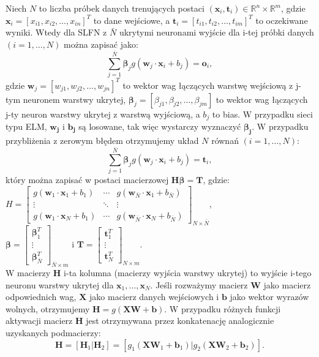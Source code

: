 \documentclass{article}
\begin{document}
Niech $N$ to liczba próbek danych trenujących postaci $(\bm{x}_i, \bm{t}_i) \in \mathbb{R}^n \times \mathbb{R}^m$, gdzie $\bm{x}_i = [x_{i1}, x_{i2}, \dots,  x_{in}]^T$ to dane wejściowe, a $\bm{t}_i = [t_{i1}, t_{i2}, \dots,  t_{im}]^T$ to oczekiwane wyniki. Wtedy dla SLFN z $\bar{N}$ ukrytymi neuronami wyjście dla i-tej próbki danych $(i=1,\dots,N)$ można zapisać jako:
\begin{equation}
\sum_{j=1}^{\bar{N}} \bm{\beta}_j g (\bm{w}_j \cdot \bm{x}_i + b_j)  = \bm{o}_i,
\end{equation}
gdzie $\bm{w}_j = [w_{j1}, w_{j2},\dots,w_{jn}]^T$ to wektor wag łączących warstwę wejściową z j-tym neuronem warstwy ukrytej, $\bm{\beta}_j = [\beta_{j1}, \beta_{j2}, \dots, \beta_{jm}]$ to wektor wag łączących j-ty neuron warstwy ukrytej z warstwą wyjściową, a $b_j$ to bias. W przypadku sieci typu ELM, $\bm{w_j}$ i $\bm{b_j}$ są losowane, tak więc wystarczy wyznaczyć $\bm{\beta_j}$.  W przypadku przybliżenia z zerowym błędem otrzymujemy układ $N$ równań $(i=1,\dots,N)$:
\begin{equation}
\sum_{j=1}^{\bar{N}} \bm{\beta}_j g (\bm{w}_j \cdot \bm{x}_i + b_j)  = \bm{t}_i,
\end{equation}
który można zapisać w postaci macierzowej $\bm{H}\bm{\beta}=\bm{T}$, gdzie: \\
$
H = \begin{bmatrix}
 g(\bm{w}_1 \cdot \bm{x}_1 + b_1) & \cdots & g(\bm{w}_{\bar{N}} \cdot \bm{x}_1 + b_{\bar{N}}) \\
 \vdots & \ddots & \vdots \\
 g(\bm{w}_1 \cdot \bm{x}_N + b_1) & \cdots & g(\bm{w}_{\bar{N}} \cdot \bm{x}_N + b_{\bar{N}})
\end{bmatrix}_{N \times \bar{N}}$, \\
$\bm{\beta} = \begin{bmatrix} \bm{\beta}_1^T \\ \vdots \\ \bm{\beta}_{\bar{N}}^T \end{bmatrix}_{\bar{N} \times m}$ i 
 $ \bm{T} = \begin{bmatrix} \bm{t}_1^T \\ \vdots \\ \bm{t}_N^T \end{bmatrix}_{N \times m}. $\\
W macierzy $\bm{H}$ i-ta kolumna (macierzy wyjścia warstwy ukrytej) to wyjście i-tego neuronu warstwy ukrytej dla $\bm{x}_1, \dots, \bm{x}_N$. Jeśli rozważymy macierz $\bm{W}$ jako macierz odpowiednich wag, $\bm{X}$ jako macierz danych wejściowych i $\bm{b}$ jako wektor wyrazów wolnych, otrzymujemy $\bm{H} = g(\bm{XW} + \bm{b})$. W przypadku różnych funkcji aktywacji macierz $\bm{H}$ jest otrzymywana przez konkatenację analogicznie uzyskanych podmacierzy: 
\begin{equation}
\bm{H} = [\bm{H}_1 | \bm{H}_2] = [g_1(\bm{XW}_1 + \bm{b}_1) | g_2(\bm{XW}_2 + \bm{b}_2)]. 
\end{equation}
\end{document}

